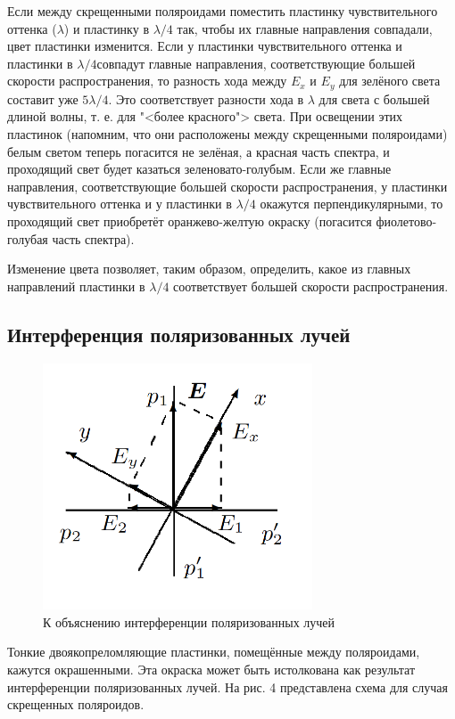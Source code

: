 \documentclass[15pt,a5paper,reqno]{article}
\begin{document}
Если между скрещенными поляроидами поместить пластинку чувствительного оттенка
($ \lambda $) и пластинку в $ \lambda/4 $ так, чтобы их главные
направления совпадали, цвет пластинки изменится. Если у пластинки чувствительного оттенка и пластинки в $ \lambda/4  $совпадут главные направления, соответствующие большей скорости распространения, то разность хода между $ E_x $ и $ E_y $ для зелёного света составит уже $ 5\lambda/4 $. Это соответствует разности хода в $ \lambda $ для света с большей длиной волны, т. е. для "<более красного"> света. При освещении
этих пластинок (напомним, что они расположены между скрещенными поляроидами) белым светом теперь погасится не зелёная, а красная
часть спектра, и проходящий свет будет казаться зеленовато-голубым.
Если же главные направления, соответствующие большей скорости распространения, у пластинки чувствительного оттенка и у пластинки
в $ \lambda/4 $ окажутся перпендикулярными, то проходящий свет приобретёт
оранжево-желтую окраску (погасится фиолетово-голубая часть спектра).

Изменение цвета позволяет, таким образом, определить, какое из
главных направлений пластинки в $ \lambda/4 $ соответствует большей скорости
распространения.

\subsection{Интерференция поляризованных лучей}



\begin{figure}[h!]
    \centering
    \includegraphics[width=8cm]{pics/4.png}
    \caption{К объяснению интерференции  поляризованных лучей}
    \label{fig:vac}
\end{figure}



Тонкие двоякопреломляющие пластинки, помещённые между поляроидами, кажутся окрашенными. Эта окраска может быть истолкована как результат интерференции поляризованных лучей. На рис. 4 представлена схема для
случая скрещенных поляроидов.
\end{document}
